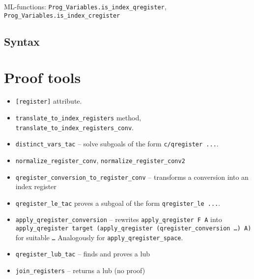 \documentclass{article}
\begin{document}
ML-functions: \verb|Prog_Variables.is_index_qregister|, \verb|Prog_Variables.is_index_cregister|

\subsection{Syntax}

\section{Proof tools}

\begin{itemize}
\item \verb|[register]| attribute.
\item \verb|translate_to_index_registers| method, \verb|translate_to_index_registers_conv|. 
\item \verb|distinct_vars_tac| -- solve subgoals of the form \verb|c/qregister ...|.
\item \verb|normalize_register_conv|, \verb|normalize_register_conv2|
\item \verb|qregister_conversion_to_register_conv| -- transforms a conversion into an index register
 
\item \verb|qregister_le_tac| proves a subgoal of the form \verb|qregister_le ...|.
\item \verb|apply_qregister_conversion| -- rewrites \verb|apply_qregister F A| into \verb|apply_qregister target (apply_qregister (qregister_conversion …) A)|
  for suitable \verb|…|
  Analogously for \verb|apply_qregister_space|.
\item \verb|qregister_lub_tac| -- finds and proves a lub
\item \verb|join_registers| -- returns a lub (no proof)
\end{itemize}
\end{document}
